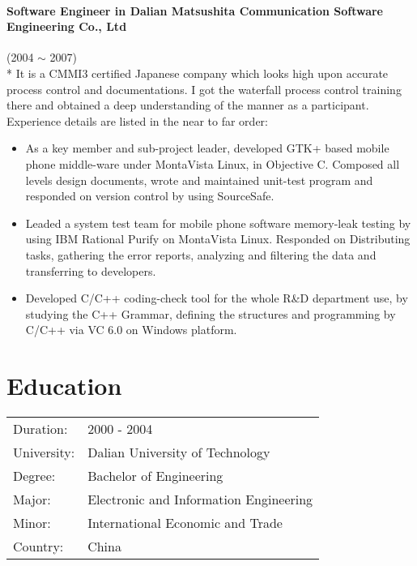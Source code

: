 \documentclass[a4paper,11pt]{article}
\begin{document}
\paragraph{Software Engineer in Dalian Matsushita Communication Software Engineering Co., Ltd} (2004 $\sim$ 2007) \\*
It is a CMMI3 certified Japanese company which looks high upon accurate process control and documentations. I got the waterfall process control training there and obtained a deep understanding of the manner as a participant. Experience details are listed in the near to far order:
\begin{itemize}
\item As a key member and sub-project leader, developed GTK+ based mobile phone middle-ware under MontaVista Linux, in Objective C. Composed all levels design documents, wrote and maintained unit-test program and responded on version control by using SourceSafe.
\item Leaded a system test team for mobile phone software memory-leak testing by using IBM Rational Purify on MontaVista Linux. Responded on Distributing tasks, gathering the error reports, analyzing and filtering the data and transferring to developers.
\item Developed C/C++ coding-check tool for the whole R\&D department use, by studying the C++ Grammar, defining the structures and programming by C/C++ via VC 6.0 on Windows platform.
\end{itemize}

\section*{Education}
\begin{tabular}{l l}
Duration:   & 2000 - 2004 \\
University: & Dalian University of Technology \\
Degree:     & Bachelor of Engineering \\
Major:      & Electronic and Information Engineering \\
Minor:      & International Economic and Trade \\
Country:    & China \\
\end{tabular}
\end{document}
